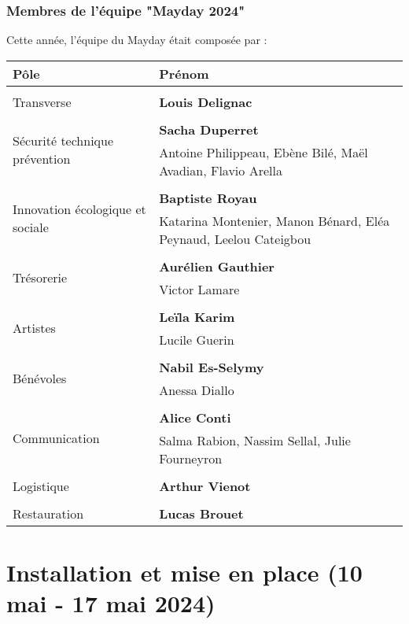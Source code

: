 \documentclass[12pt,a4paper,draft]{report}
\begin{document}
\section{Membres de l'équipe "Mayday 2024"}
Cette année, l'équipe du Mayday était composée par :
\begin{center}
\begin{tabular}{| m{3cm} | m{9cm} |}
\hline
Pôle & Prénom \\ 
 \hline\hline\\
Transverse & \textbf{Louis Delignac}\\ 
\hline\\
\multirow{2}{5em}{Sécurité technique prévention} & \textbf{Sacha Duperret} \\ 
& Antoine Philippeau, Ebène Bilé, Maël Avadian, Flavio Arella\\  
 \hline\\
 \multirow{2}{5em}{Innovation écologique et sociale} & \textbf{Baptiste Royau} \\ 
& Katarina Montenier, Manon Bénard, Eléa Peynaud, Leelou Cateigbou\\
 \hline\\
  \multirow{2}{5em}{Trésorerie} & \textbf{Aurélien Gauthier} \\ 
& Victor Lamare\\
 \hline\\
 \multirow{2}{5em}{ Artistes} & \textbf{Leïla Karim} \\
& Lucile Guerin\\
 \hline\\
\multirow{2}{5em}{Bénévoles} & \textbf{Nabil Es-Selymy} \\ 
& Anessa Diallo\\
 \hline\\
\multirow{2}{7em}{Communication} & \textbf{Alice Conti} \\ 
& Salma Rabion, Nassim Sellal, Julie Fourneyron\\
 \hline\\
 \multirow{1}{5em}{Logistique} & \textbf{Arthur Vienot} \\ 
 \hline\\
 \multirow{1}{6em}{Restauration} & \textbf{Lucas Brouet} \\ 
 \hline
\end{tabular}
\end{center}

\part{Installation et mise en place (10 mai - 17 mai 2024)}
\end{document}
